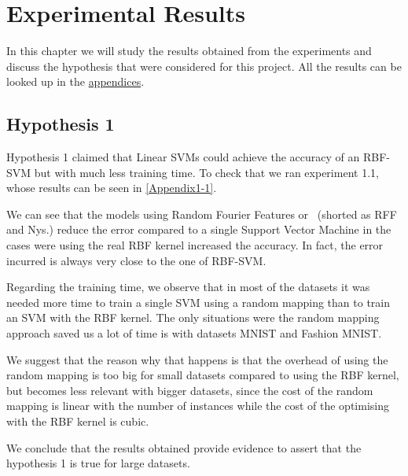 
\chapter{Experimental Results} %

\label{Chapter4} %


\begin{pre-delivery}
  In this chapter we will study the results obtained from the experiments and
  discuss the hypothesis that were considered for this project. All the results
  can be looked up in the \hyperref[Appendix1-1]{appendices}.

\section*{Hypothesis 1}
\label{disc:h1}

Hypothesis 1 claimed that Linear SVMs could achieve the accuracy of an
RBF-SVM but with much less training time. To check that we ran experiment
1.1, whose results can be seen in \ref{Appendix1-1}.

We can see that the models using Random Fourier Features or \Nys\ (shorted as
RFF and Nys.) reduce the error compared to a single Support Vector Machine
in the cases were using the real RBF kernel increased the
accuracy. In fact, the error incurred is always very close to the one of
RBF-SVM.

Regarding the training time, we observe that in most of the datasets it was
needed more time to train a single SVM using a random mapping than to train
an SVM with the RBF kernel. The only situations were the random mapping approach
saved us a lot of time is with datasets MNIST and Fashion MNIST.

We suggest that the reason why that happens is that the overhead of using
the random mapping is too big for small datasets compared to using the RBF
kernel, but becomes less relevant with bigger datasets, since the cost of
the random mapping is linear with the number of instances while the cost of the
optimising with the RBF kernel is cubic.

We conclude that the results obtained provide evidence to assert that the
hypothesis 1 is true for large datasets.


\end{pre-delivery}
